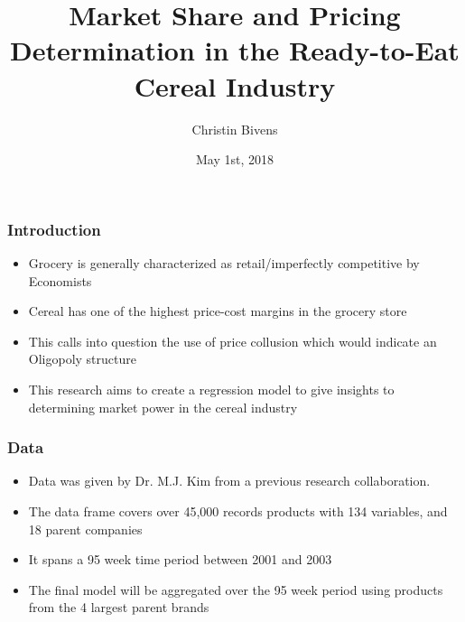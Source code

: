 \documentclass{beamer}
\title{Market Share and Pricing Determination in the Ready-to-Eat Cereal Industry}
\author{Christin Bivens}
\date{May 1st, 2018}
\begin{document}
 
\frame{\titlepage}
 
\begin{frame}
\frametitle{Introduction}

\begin{itemize}
 \item Grocery is generally characterized as retail/imperfectly competitive by Economists
 \item Cereal has one of the highest price-cost margins in the grocery store
 \item This calls into question the use of price collusion which would indicate an Oligopoly structure
 \item This research aims to create a regression model to give insights to determining market power in the cereal industry
\end{itemize}

\end{frame}

\begin{frame}
\frametitle{Data}

\begin{itemize}
 \item Data was given by Dr. M.J. Kim from a previous research collaboration. 
 \item The data frame covers over 45,000 records products with 134 variables, and 18 parent companies
 \item It spans a 95 week time period between 2001 and 2003
 \item The final model will be aggregated over the 95 week period using products from the 4 largest parent brands

\end{itemize}

\end{frame}
\end{document}
